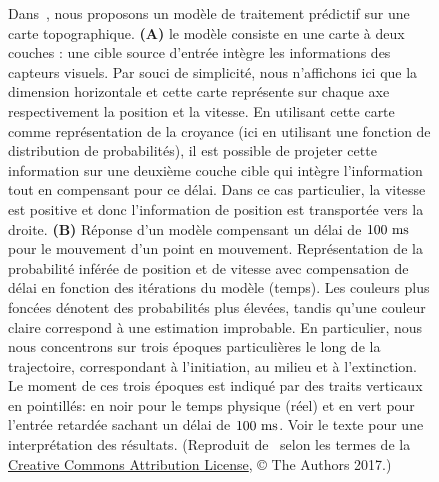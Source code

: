\begin{figure}%
\caption{
Dans~\citep{KhoeiMassonPerrinet17}, nous proposons un
modèle de traitement prédictif sur une carte topographique. \textbf{(A)}
le modèle consiste en une carte à deux couches : une cible source
d'entrée intègre les informations des capteurs visuels. Par souci de
simplicité, nous n'affichons ici que la dimension horizontale et cette
carte représente sur chaque axe respectivement la position et la
vitesse. En utilisant cette carte comme représentation de la croyance
(ici en utilisant une fonction de distribution de probabilités), il est
possible de projeter cette information sur une deuxième couche cible qui
intègre l'information tout en compensant pour ce délai. Dans
ce cas particulier, la vitesse est positive et donc l'information de
position est transportée vers la droite. \textbf{(B)} Réponse d'un
modèle compensant un délai de $100~\si{\milli\second}$ pour le mouvement d'un point en mouvement.
Représentation de la probabilité inférée de position et de vitesse avec
compensation de délai en fonction des itérations du modèle (temps). Les
couleurs plus foncées dénotent des probabilités plus élevées, tandis
qu'une couleur claire correspond à une estimation improbable. En
particulier, nous nous concentrons sur trois époques particulières le
long de la trajectoire, correspondant à l'initiation, au milieu et à l'extinction.
Le moment de ces trois époques est indiqué par des traits
verticaux en pointillés: en noir pour le temps physique (réel) et en
vert pour l'entrée retardée sachant un délai de $100~\si{\milli\second}$. Voir le texte
pour une interprétation des résultats. (Reproduit de~\citep{KhoeiMassonPerrinet17} selon les termes de la
\href{https://journals.plos.org/ploscompbiol/article?id=10.1371/journal.pcbi.1005068}{Creative
Commons Attribution License}, © The Authors 2017.)
}
\label{fig:KhoeiMassonPerrinet17}
\end{figure}

